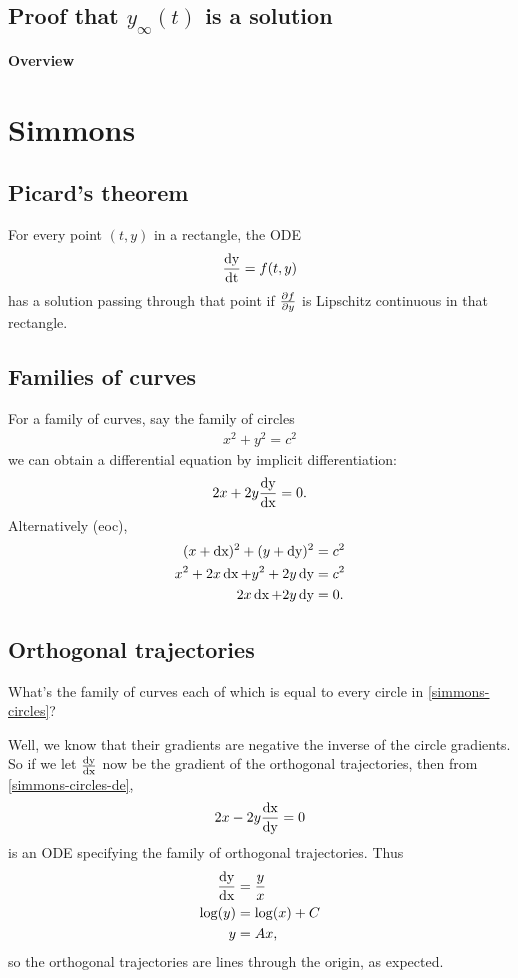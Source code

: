 \subsection{Proof that $y_\infty(t)$ is a solution}

\textbf{Overview}\\


\newpage
\section{Simmons}

\subsection{Picard's theorem}
For every point $(t, y)$ in a rectangle, the ODE
\begin{align*}
  \frac{\operatorname{\text{dy}}}{\operatorname{\text{dt}}} = f(t, y)
\end{align*}
has a solution passing through that point if $\frac{\partial f}{\partial y}$ is Lipschitz
continuous in that rectangle.

\subsection{Families of curves}
For a family of curves, say the family of circles
\begin{align}
  x^2 + y^2 = c^2 \label{simmons-circles}
\end{align}
we can obtain a differential equation by implicit differentiation:
\begin{align}
  2x + 2y\frac{\operatorname{\text{dy}}}{\operatorname{\text{dx}}} = 0. \label{simmons-circles-de}
\end{align}
Alternatively (eoc),
\begin{align*}
  (x + \operatorname{\text{dx}})^2 + (y + \operatorname{\text{dy}})^2 &= c^2\\
  x^2 + 2x\operatorname{\text{dx}} + y^2 + 2y\operatorname{\text{dy}} &= c^2\\
        2x\operatorname{\text{dx}}  + 2y\operatorname{\text{dy}}     &= 0.
\end{align*}

\subsection{Orthogonal trajectories}
What's the family of curves each of which is equal to every circle in \eqref{simmons-circles}?

Well, we know that their gradients are negative the inverse of the circle
gradients. So if we let $\frac{\operatorname{\text{dy}}}{\operatorname{\text{dx}}}$ now be the gradient of the orthogonal
trajectories, then from \eqref{simmons-circles-de},
\begin{align*}
  2x - 2y\frac{\operatorname{\text{dx}}}{\operatorname{\text{dy}}} = 0
\end{align*}
is an ODE specifying the family of orthogonal trajectories. Thus
\begin{align*}
  \frac{\operatorname{\text{dy}}}{\operatorname{\text{dx}}} &= \frac{y}{x}\\
  \log(y) &= \log(x) + C\\
       y &= Ax,
\end{align*}
so the orthogonal trajectories are lines through the origin, as expected.


